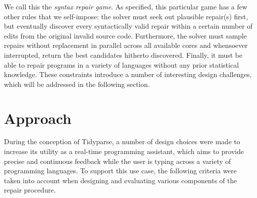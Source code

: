 \documentclass[sigplan,screen]{acmart}
\begin{document}
We call this the \textit{syntax repair game}. As specified, this particular game has a few other rules that we self-impose: the solver must seek out plausible repair(s) first, but eventually discover every syntactically valid repair within a certain number of edits from the original invalid source code. Furthermore, the solver must sample repairs without replacement in parallel across all available cores and whensoever interrupted, return the best candidates hitherto discovered. Finally, it must be able to repair programs in a variety of languages without any prior statistical knowledge. These constraints introduce a number of interesting design challenges, which will be addressed in the following section.

\section{Approach}


During the conception of Tidyparse, a number of design choices were made to increase its utility as a real-time programming assistant, which aims to provide precise and continuous feedback while the user is typing across a variety of programming languages. To support this use case, the following criteria were taken into account when designing and evaluating various components of the repair procedure.
\end{document}
